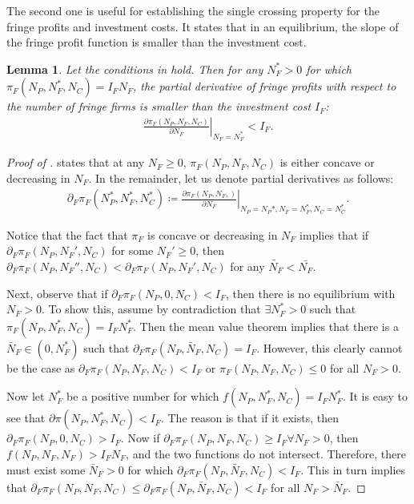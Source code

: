 \documentclass[a4paper]{article}
\newtheorem{lemma}{Lemma}
\begin{document}
The second one is useful for establishing the single crossing property for the fringe profits and investment costs.
It states that in an equilibrium, the slope of the fringe profit function is smaller than the investment cost.
\begin{lemma}
    \label{lem:slope_at_eq}
    Let the conditions in  hold. Then for any $N_F^* > 0$ for which $\pi_F(N_P, N_F^*, N_C) = I_F N_F$, the partial derivative of fringe profits with respect to the number of fringe firms is smaller than the investment cost $I_F$:
    \begin{align*}
        \left. \frac{\partial \pi_F(N_P, N_F, N_C)}{\partial N_F} \right|_{N_F = N_F^*} < I_F.
    \end{align*}
\end{lemma}
\begin{proof}[Proof of ]
     states that at any $N_F \geq 0$, $\pi_F(N_P, N_F, N_C)$ is either concave or decreasing in $N_F$.
    In the remainder, let us denote partial derivatives as follows:
    \begin{align*}
        \partial_F \pi_F(N_P^*, N_F^*, N_C^*) \coloneqq \left. \frac{\partial \pi_F(N_P, N_F,  )}{\partial N_F} \right|_{N_P = N_P*, N_F = N_F^*, N_C = N_C^*}.
    \end{align*}

    Notice that the fact that $\pi_F$ is concave or decreasing in $N_F$ implies that if $\partial_F \pi_F(N_P, N_F', N_C)$ for some $N_F' \geq 0$, then $\partial_F \pi_F(N_P, N_F'', N_C) < \partial_F \pi_F(N_P, N_F', N_C)$ for any $\tilde{N_F} < \bar{N_F}$.

    Next, observe that if $\partial_F \pi_F(N_P, 0, N_C) < I_F$, then there is no equilibrium with $N_F > 0$.
    To show this, assume by contradiction that $\exists N_F^* > 0$ such that $\pi_F(N_P, N_F^*, N_C) = I_F N_F^*$.
    Then the mean value theorem implies that there is a $\bar{N}_F \in (0, N_F^*)$ such that $\partial_F \pi_F(N_P, \bar{N}_F, N_C) = I_F$.
    However, this clearly cannot be the case as $\partial_F \pi_F(N_P, N_F, N_C) < I_F$ or $\pi_F(N_P, N_F, N_C) \leq 0$ for all $N_F > 0$.

    Now let $N_F^*$ be a positive number for which $f(N_P, N_F^*, N_C) = I_F N_F^*$.
    It is easy to see that $\partial \pi(N_P, N_F^*, N_C) < I_F$.
    The reason is that if it exists, then $\partial_F \pi_F(N_P, 0, N_C) > I_F$.
    Now if $\partial_F \pi_F(N_P, N_F, N_C) \geq I_F \forall N_F > 0$, then $f(N_P, N_F, N_F) > I_F N_F$, and the two functions do not intersect.
    Therefore, there must exist some $\bar{N}_F > 0$ for which $\partial_F \pi_F(N_P, \bar{N}_F, N_C) < I_F$.
    This in turn implies that $\partial_F \pi_F(N_P, N_F, N_C) \leq \partial_F \pi_F(N_P, \bar{N}_F, N_C) < I_F$ for all $N_F > \bar{N}_F$.
\end{proof}
\end{document}
